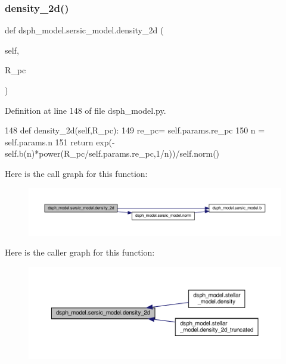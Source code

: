 \subsubsection{\texorpdfstring{density\+\_\+2d()}{density\_2d()}}
{\footnotesize\ttfamily def dsph\+\_\+model.\+sersic\+\_\+model.\+density\+\_\+2d (\begin{DoxyParamCaption}\item[{}]{self,  }\item[{}]{R\+\_\+pc }\end{DoxyParamCaption})}



Definition at line 148 of file dsph\+\_\+model.\+py.


\begin{DoxyCode}
148     \textcolor{keyword}{def }density\_2d(self,R\_pc):
149         re\_pc= self.params.re\_pc
150         n = self.params.n
151         \textcolor{keywordflow}{return} exp(-self.b(n)*power(R\_pc/self.params.re\_pc,1/n))/self.norm()
\end{DoxyCode}
Here is the call graph for this function\+:\nopagebreak
\begin{figure}[H]
\begin{center}
\leavevmode
\includegraphics[width=350pt]{d0/de9/classdsph__model_1_1sersic__model_afd0e257748b9a1b46c2f5443e3214523_cgraph}
\end{center}
\end{figure}
Here is the caller graph for this function\+:\nopagebreak
\begin{figure}[H]
\begin{center}
\leavevmode
\includegraphics[width=350pt]{d0/de9/classdsph__model_1_1sersic__model_afd0e257748b9a1b46c2f5443e3214523_icgraph}
\end{center}
\end{figure}
\mbox{\label{classdsph__model_1_1sersic__model_a555bceba3036d02a71218318516bba8a}} 
